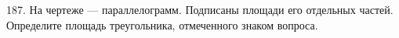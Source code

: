 187. На чертеже --- параллелограмм. Подписаны площади его отдельных частей. Определите площадь треугольника, отмеченного знаком вопроса.
\begin{figure}[ht!]
\end{figure}\\
